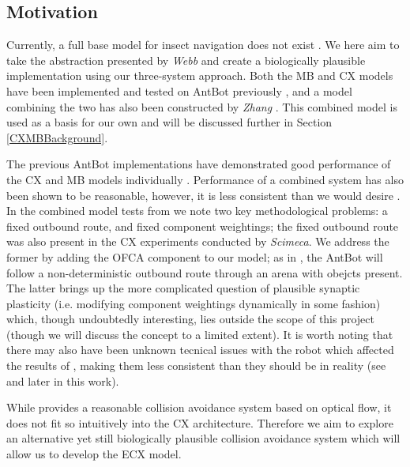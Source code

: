 \documentclass[a4paper,11pt,twoside,openright]{article}
\begin{document}
\subsection{ Motivation }
Currently, a full base model for insect navigation does not exist
\cite{Webb2019}. We here aim to take the abstraction presented by
\textit{Webb} and create a biologically plausible implementation using
our three-system approach. Both the MB and CX models have been
implemented and tested on AntBot previously \cite{Scimeca2017,
  Mitchell2018, Eberding2016, Zhang2017}, and a model combining the
two has also been constructed by \textit{Zhang} \cite{Zhang2017}.
This combined model is used as a basis for our own and will be
discussed further in Section \ref{CXMBBackground}.
\newline
\par

The previous AntBot implementations have demonstrated good performance
of the CX and MB models individually \cite{Scimeca2017,
  Mitchell2018}. Performance of a combined system has also been shown
to be reasonable, however, it is less consistent than we would desire
\cite{Zhang2017}. In the combined model tests from \cite{Zhang2017} we
note two key methodological problems: a fixed outbound route, and
fixed component weightings; the fixed outbound route was also present
in the CX experiments conducted by \textit{Scimeca}. We address the
former by adding the OFCA component to our model; as in
\cite{Mitchell2018}, the AntBot will follow a non-deterministic
outbound route through an arena with obejcts present. The latter
brings up the more complicated question of plausible synaptic
plasticity (i.e. modifying component weightings dynamically in some
fashion) which, though undoubtedly interesting, lies outside the scope
of this project (though we will discuss the concept to a limited
extent). It is worth noting that there may also have been unknown
tecnical issues with the robot which affected the results of
\cite{Zhang2017}, making them less consistent than they should be in
reality (see \cite{Mitchell2018} and later in this work).
\newline
\par

While \cite{Mitchell2018} provides a reasonable collision avoidance
system based on optical flow, it does not fit so intuitively into the
CX architecture. Therefore we aim to explore an alternative yet still
biologically plausible collision avoidance system which will allow us
to develop the ECX model.
\newline
\par
\end{document}
